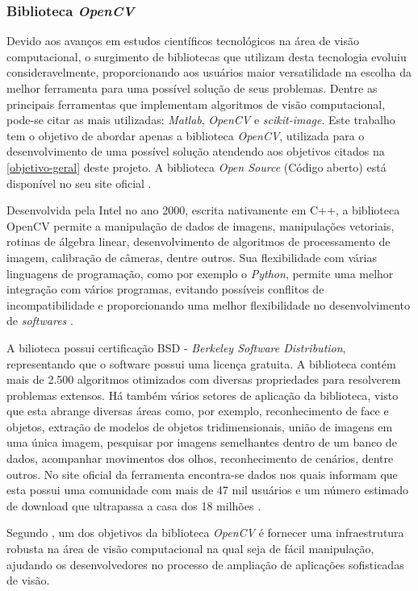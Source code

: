 \subsubsection{{Biblioteca \textit{OpenCV}}}

Devido aos avanços em estudos científicos tecnológicos na área de visão computacional, o surgimento de bibliotecas que utilizam desta tecnologia evoluiu consideravelmente, proporcionando aos usuários maior versatilidade na escolha da melhor ferramenta para uma possível solução de seus problemas. Dentre as principais ferramentas que implementam algoritmos de visão computacional, pode-se citar as mais utilizadas: \textit{Matlab}, \textit{OpenCV} e \textit{scikit-image}. Este trabalho tem o objetivo de abordar apenas a biblioteca \textit{OpenCV}, utilizada para o desenvolvimento de uma possível solução atendendo aos objetivos citados na \autoref{objetivo-geral} deste projeto. A biblioteca \textit{Open Source} (Código aberto) está disponível no seu site oficial .

Desenvolvida pela Intel no ano 2000, escrita nativamente em C++, a biblioteca OpenCV permite a manipulação de dados de imagens, manipulações vetoriais, rotinas de álgebra linear, desenvolvimento de algoritmos de processamento de imagem, calibração de câmeras, dentre outros. Sua flexibilidade com várias linguagens de programação, como por exemplo o \textit{Python}, permite uma melhor integração com vários programas, evitando possíveis conflitos de incompatibilidade e proporcionando uma melhor flexibilidade no desenvolvimento de \textit{softwares} \cite{BARBOZA2009}.

A bilioteca possui certificação BSD - \textit{Berkeley Software Distribution}, representando que o software possui uma licença gratuita. A biblioteca contém mais de 2.500 algoritmos otimizados com diversas propriedades para resolverem problemas extensos. Há também vários setores de aplicação da biblioteca, visto que esta abrange diversas áreas como, por exemplo, reconhecimento de face e objetos, extração de modelos de objetos tridimensionais, união de imagens em uma única imagem, pesquisar por imagens semelhantes dentro de um banco de dados, acompanhar movimentos dos olhos, reconhecimento de cenários, dentre outros. No site oficial da ferramenta encontra-se dados nos quais informam que esta possui uma comunidade com mais de 47 mil usuários e um número estimado de download que ultrapassa a casa dos 18 milhões \cite{CUNHA2013}.

Segundo , um dos objetivos da biblioteca \textit{OpenCV} é fornecer uma infraestrutura robusta na área de visão computacional na qual seja de fácil manipulação, ajudando os desenvolvedores no processo de ampliação de aplicações sofisticadas de visão.